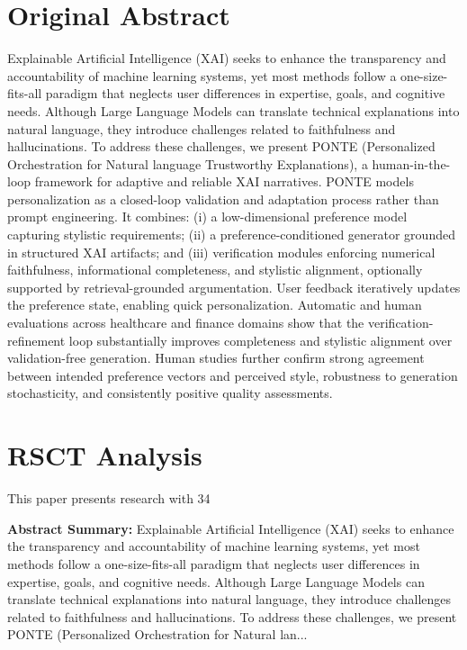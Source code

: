 \documentclass[11pt,a4paper]{article}
\begin{document}
\section{Original Abstract}
Explainable Artificial Intelligence (XAI) seeks to enhance the transparency and accountability of machine learning systems, yet most methods follow a one-size-fits-all paradigm that neglects user differences in expertise, goals, and cognitive needs. Although Large Language Models can translate technical explanations into natural language, they introduce challenges related to faithfulness and hallucinations. To address these challenges, we present PONTE (Personalized Orchestration for Natural language Trustworthy Explanations), a human-in-the-loop framework for adaptive and reliable XAI narratives. PONTE models personalization as a closed-loop validation and adaptation process rather than prompt engineering. It combines: (i) a low-dimensional preference model capturing stylistic requirements; (ii) a preference-conditioned generator grounded in structured XAI artifacts; and (iii) verification modules enforcing numerical faithfulness, informational completeness, and stylistic alignment, optionally supported by retrieval-grounded argumentation. User feedback iteratively updates the preference state, enabling quick personalization. Automatic and human evaluations across healthcare and finance domains show that the verification-refinement loop substantially improves completeness and stylistic alignment over validation-free generation. Human studies further confirm strong agreement between intended preference vectors and perceived style, robustness to generation stochasticity, and consistently positive quality assessments.

\section{RSCT Analysis}
This paper presents research with 34%

\textbf{Abstract Summary:} Explainable Artificial Intelligence (XAI) seeks to enhance the transparency and accountability of machine learning systems, yet most methods follow a one-size-fits-all paradigm that neglects user differences in expertise, goals, and cognitive needs. Although Large Language Models can translate technical explanations into natural language, they introduce challenges related to faithfulness and hallucinations. To address these challenges, we present PONTE (Personalized Orchestration for Natural lan...
\end{document}
